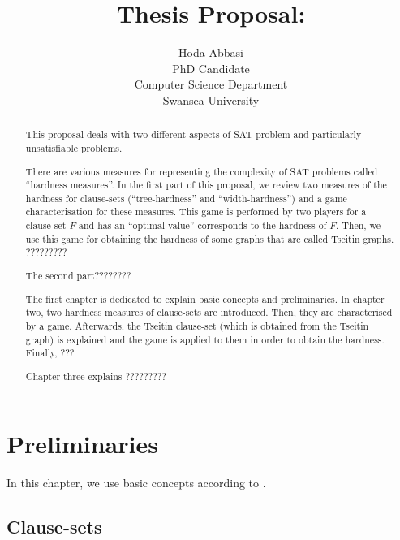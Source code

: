 \documentclass{report}
\begin{document}
\title{Thesis Proposal: 
       }

\author{Hoda Abbasi\\
        PhD Candidate\\
        Computer Science Department\\
        Swansea University\\}
\maketitle


\begin{abstract}
This proposal deals with two different aspects of SAT problem and particularly unsatisfiable problems. 

There are various measures for representing the complexity of SAT problems called ``hardness measures''. In the first part of this proposal, we review two measures of the hardness for clause-sets (``tree-hardness'' and ``width-hardness'') and a game characterisation for these measures. This game is performed by two players for a clause-set $F$ and has an ``optimal value'' corresponds to the hardness of $F$. Then, we use this game for obtaining the hardness of some graphs that are called Tseitin graphs. ?????????

The second part????????

The first chapter is dedicated to explain basic concepts and preliminaries. In chapter two, two hardness measures of clause-sets are introduced. Then, they are characterised by a game. Afterwards, the Tseitin clause-set (which is obtained from the Tseitin graph) is explained and the game is applied to them in order to obtain the hardness. Finally, ???

Chapter three explains ?????????
\end{abstract}

\tableofcontents
\chapter{Preliminaries}
\label{cha:Preliminaries}

In this chapter, we use basic concepts according to \cite{h8, h18,h9}. 

\section{Clause-sets}
\label{sec:Clause-sets}
\end{document}
